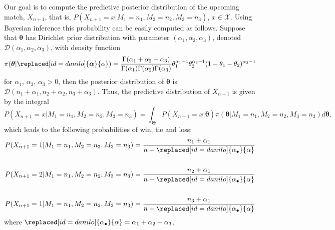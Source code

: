 \documentclass[journal,article,accept,moreauthors,pdftex,12pt,a4paper]{mdpi}
\begin{document}
	Our goal is to compute the predictive posterior distribution of the
	upcoming match, $X_{n+1}$, that is,
	$P(X_{n+1}=x|M_1=n_1,M_2=n_2,M_3=n_3)$, $x\in\mathcal{X}$. Using
	Bayesian inference this probability can be easily computed as
	follows. Suppose that $\boldsymbol{\theta}$ has Dirichlet prior distribution
	with parameter $(\alpha_1,\alpha_2,\alpha_3)$, denoted
	$\mathcal{D}(\alpha_1,\alpha_2,\alpha_3)$, with density function
	\[
	\pi(\boldsymbol{\theta}|\replaced[id=danilo]{\boldsymbol{\alpha}}{\alpha})=\frac{\Gamma(\alpha_1+\alpha_2+\alpha_3)}{\Gamma(\alpha_1)\Gamma(\alpha_2)\Gamma(\alpha_3)}\theta_1^{\alpha_1-1}\theta_2^{\alpha_2-1}(1-\theta_1-\theta_2)^{\alpha_3-1}
	\]
	\noindent for $\alpha_1$, $\alpha_2$, $\alpha_3 > 0$, then the
	posterior distribution of $\boldsymbol{\theta}$ is
	$\mathcal{D}(n_1+\alpha_1,n_2+\alpha_2,n_3+\alpha_3)$. Thus, the
	predictive distribution of $X_{n + 1}$ is given by the
	integral
	$$
	P(X_{n + 1} = x | M_1 = n_1, M_2 = n_2, M_3 = n_3) = \int_{\boldsymbol{\Theta}} P(X_{n
		+ 1} = x | \boldsymbol{\theta}) \pi(\boldsymbol{\theta} | M_1 = n_1, M_2 = n_2, M_3
	= n_3) d\boldsymbol{\theta},
	$$
	which leads to the following probabilities of win, tie and loss:
	\begin{align*}
	P(X_{n+1} = 1 | M_1=n_1,M_2=n_2,M_3=n_3) &=
	\frac{n_1+\alpha_1}{n+\replaced[id=danilo]{\alpha_{\bullet}}{\alpha}}\\
	& \\
	P(X_{n+1} = 2 | M_1=n_1,M_2=n_2,M_3=n_3) &=
	\frac{n_2+\alpha_1}{n+\replaced[id=danilo]{\alpha_{\bullet}}{\alpha}} \\
	& \\
	P(X_{n+1} = 1 | M_1=n_1, M_2=n_2, M_3=n_3) &=
	\frac{n_3+\alpha_1}{n+\replaced[id=danilo]{\alpha_{\bullet}}{\alpha}}
	\end{align*}
	\noindent where $\replaced[id=danilo]{\alpha_{\bullet}}{\alpha} =\alpha_1+\alpha_2+\alpha_3$.
	
\end{document}
